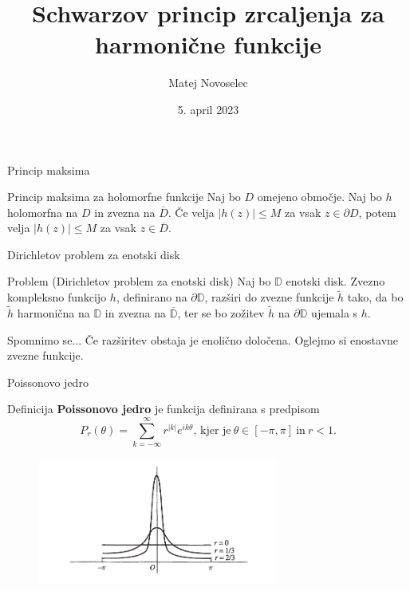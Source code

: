 \documentclass{beamer}
\title{Schwarzov princip zrcaljenja za harmonične funkcije}
\author{Matej Novoselec}
\institute[UL FMF]{FMF Fakulteta za matematiko in fiziko}
\date{5. april 2023}
\theoremstyle{definition}
\theoremstyle{definition}
\begin{document}
\begin{frame}
   \titlepage
\end{frame}
\begin{frame}{Princip maksima}
   \begin{alertblock}{Princip maksima za holomorfne funkcije}
      Naj bo $D$ omejeno območje. Naj bo $h$ holomorfna na $D$ in zvezna na $\overline{D}$.
      Če velja $|h(z)| \leq M$ za vsak $z \in \partial D$, potem velja $|h(z)| \leq M$ za vsak $z \in \overline{D}$.
   \end{alertblock}  
\end{frame}
\begin{frame}{Dirichletov problem za enotski disk}
   \begin{alertblock}{Problem (Dirichletov problem za enotski disk)}
        Naj bo $\mathbb{D}$ enotski disk. Zvezno kompleksno funkcijo $h$, definirano na $\partial \mathbb{D}$, razširi do zvezne funkcije $\widetilde{h}$ tako, da bo $\widetilde{h}$ harmonična na $\mathbb{D}$ in zvezna na $\overline{\mathbb{D}}$, ter se bo zožitev $\widetilde{h}$ na $\partial \mathbb{D}$ ujemala s $h$.
   \end{alertblock}
   \begin{exampleblock}{Spomnimo se...}
    \pause
    Če razširitev obstaja je enolično določena.
    \pause
    \newline
    Oglejmo si enostavne zvezne funkcije.
   \end{exampleblock}
\end{frame}

\begin{frame}{Poissonovo jedro}
   \begin{block}{Definicija}
      \textbf{Poissonovo jedro} je funkcija definirana s predpisom
      $$
         P_r(\theta) = \sum_{k = -\infty}^{\infty}{r^{|k|} e^{i k \theta}}\text{, kjer je}~\theta \in [-\pi, \pi]~\text{in}~ r < 1.
      $$
   \end{block}
   \pause
   \begin{figure}
      \begin{center}
         \includegraphics[width=0.70\textwidth]{poissonkernel.png}
      \end{center}
   \end{figure}
\end{frame}
\end{document}
